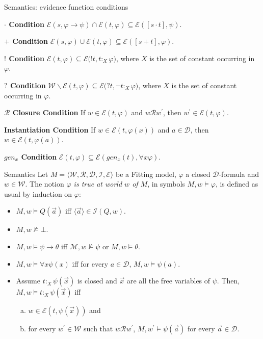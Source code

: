 \documentclass{beamer}
\theoremstyle{definition}
\newcommand{\D}{\mathcal{D}}
\newcommand{\W}{\mathcal{W}}
\newcommand{\R}{\mathcal{R}}
\newcommand{\M}{\mathcal{M}}
\newcommand{\E}{\mathcal{E}}
\newcommand{\I}{\mathcal{I}}
\newcommand{\Fmodel}{\bl\W,\R,\D,\I,\E \br}
\newcommand{\p}{^{\prime}}
\newcommand{\nmodels}{\not\models}
\newcommand{\nao}{\neg}
\newcommand{\impli}{\rightarrow}
\newcommand{\todo}{\forall}
\newcommand{\bl}{\langle}
\newcommand{\br}{\rangle}
\begin{document}
\begin{frame}{Semantics: evidence function conditions}
\begin{itemize} 
	\item[] \textbf{$\cdot$ Condition} $\E (s, \varphi \impli \psi) \cap \E(t, \varphi) \subseteq \E([s\cdot t], \psi).$\\
	\item[] \textbf{$+$ Condition} $\E (s, \varphi) \cup \E(t, \varphi) \subseteq \E([s+t], \varphi).$
	\item[] \textbf{$!$ Condition} $\E (t, \varphi) \subseteq \E(!t, t$$:_{X}\varphi)$, where $X$ is the set of constant occurring in $\varphi$.
	{\color{blue} \item[] \textbf{$?$ Condition} $\W  \backslash \E (t, \varphi) \subseteq \E(?t,\nao t$$:_{X}\varphi)$, where $X$ is the set of constant occurring in $\varphi$.}
	\item[] \textbf{$\R$ Closure Condition} If $w \in \E (t, \varphi)$ and $w \R w\p$, then $w\p \in \E (t, \varphi)$.
	\item[] \textbf{Instantiation Condition} If $w \in \E (t, \varphi(x))$ and $a \in \D$, then $w \in \E (t, \varphi(a))$.
	\item[] \textbf{$gen_{x}$ Condition} $\E (t, \varphi) \subseteq \E(gen_{x}(t),\todo x\varphi)$.
\end{itemize}		
\end{frame}
	

\begin{frame}{Semantics}
Let $M = \Fmodel$ be a Fitting model, $\varphi$ a closed $\D$-formula and $w \in \W$. The notion \textit{$\varphi$ is true at world $w$ of $M$}, in symbols $M,w \models \varphi$, is defined as usual by induction on $\varphi$: 
\begin{itemize} 
	\item $M,w \models Q(\vec{a})$ iff $\bl \vec{a}\br \in \I(Q,w)$. 
	\item $M,w \nmodels \bot$. 
	\item $M,w \models \psi \impli \theta$ iff $\M,w \nmodels \psi$ or $M,w \models \theta$.
	\item $M,w \models \todo x \psi(x)$ iff for every $a \in \D$, $M,w \models \psi(a)$.
	\item Assume $t$$:_{X}$$\psi(\vec{x})$ is closed and $\vec{x}$ are all the free variables of $\psi$. Then, $M,w \models t$$:_{X}$$\psi(\vec{x})$ iff
	\begin{enumerate}[(a)]
		\item $w \in \E (t, \psi(\vec{x}))$ and
		\item for every $w\p \in \W$ such that $w\R w\p$, $M,w\p \models \psi(\vec{a})$ for every $\vec{a} \in \D$.
	\end{enumerate}
	
\end{itemize}		
\end{frame}
	
\end{document}
